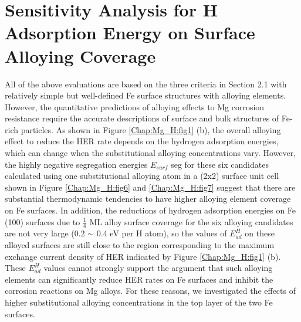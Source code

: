 \section{Sensitivity Analysis for H Adsorption Energy on Surface Alloying Coverage}

All of the above evaluations are based on the three criteria in Section 2.1 with relatively simple but well-defined Fe surface structures with alloying elements. However, the quantitative predictions of alloying effects to Mg corrosion resistance require the accurate descriptions of surface and bulk structures of Fe-rich particles. As shown in Figure \ref{Chap:Mg_H:fig1} (b), the overall alloying effect to reduce the \ac{HER} rate depends on the hydrogen adsorption energies, which can change when the substitutional alloying concentrations vary. However, the highly negative segregation energies $E_{surf}$ seg for these six candidates calculated using one substitutional alloying atom in a (2x2) surface unit cell shown in Figure \ref{Chap:Mg_H:fig6} and \ref{Chap:Mg_H:fig7} suggest that there are substantial thermodynamic tendencies to have higher alloying element coverage on Fe surfaces. In addition, the reductions of hydrogen adsorption energies on Fe (100) surfaces due to $\frac{1}{4}$ \ac{ML} alloy surface coverage for the six alloying candidates are not very large (0.2 $\sim$ 0.4 eV per H atom), so the values of $E_{ad}^H$  on these alloyed surfaces are still close to the region corresponding to the maximum exchange current density of HER indicated by Figure \ref{Chap:Mg_H:fig1} (b). These $E_{ad}^H$ values cannot strongly support the argument that such alloying elements can significantly reduce HER rates on Fe surfaces and inhibit the corrosion reactions on Mg alloys. For these reasons, we investigated the effects of higher substitutional alloying concentrations in the top layer of the two Fe surfaces.


